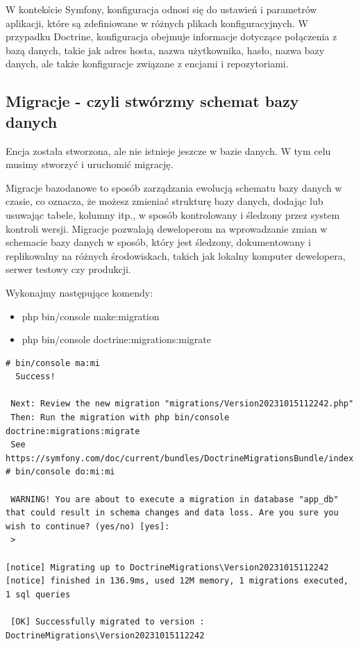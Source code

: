 \documentclass[polish, a4paper]{article}
\begin{document}
W kontekście Symfony, konfiguracja odnosi się do ustawień i parametrów aplikacji, które są zdefiniowane w różnych plikach konfiguracyjnych. W przypadku Doctrine, konfiguracja obejmuje informacje dotyczące połączenia z bazą danych, takie jak adres hosta, nazwa użytkownika, hasło, nazwa bazy danych, ale także konfiguracje związane z encjami i repozytoriami.

\subsection{Migracje - czyli stwórzmy schemat bazy danych}

Encja została stworzona, ale nie istnieje jeszcze w bazie danych. W tym celu musimy stworzyć i uruchomić migrację. 

Migracje bazodanowe to sposób zarządzania ewolucją schematu bazy danych w czasie, co oznacza, że możesz zmieniać strukturę bazy danych, dodając lub usuwając tabele, kolumny itp., w sposób kontrolowany i śledzony przez system kontroli wersji. Migracje pozwalają deweloperom na wprowadzanie zmian w schemacie bazy danych w sposób, który jest śledzony, dokumentowany i replikowalny na różnych środowiskach, takich jak lokalny komputer dewelopera, serwer testowy czy produkcji.

Wykonajmy następujące komendy:

\begin{itemize}
\item php bin/console make:migration
\item php bin/console doctrine:migrations:migrate
\end{itemize}

\begin{verbatim}
# bin/console ma:mi
  Success!

 Next: Review the new migration "migrations/Version20231015112242.php"
 Then: Run the migration with php bin/console doctrine:migrations:migrate
 See https://symfony.com/doc/current/bundles/DoctrineMigrationsBundle/index.html
# bin/console do:mi:mi

 WARNING! You are about to execute a migration in database "app_db" that could result in schema changes and data loss. Are you sure you wish to continue? (yes/no) [yes]:
 >

[notice] Migrating up to DoctrineMigrations\Version20231015112242
[notice] finished in 136.9ms, used 12M memory, 1 migrations executed, 1 sql queries

 [OK] Successfully migrated to version : DoctrineMigrations\Version20231015112242
\end{verbatim}
\end{document}
